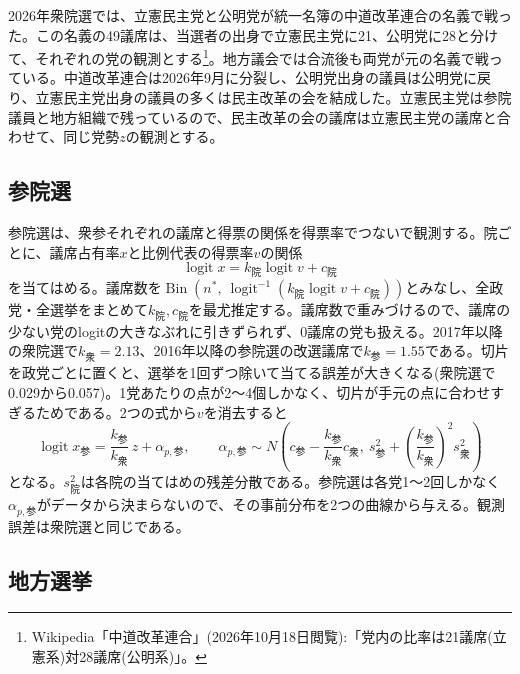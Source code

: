 \documentclass[a4paper,11pt]{ltjsarticle}
\begin{document}
2026年衆院選では、立憲民主党と公明党が統一名簿の中道改革連合の名義で戦った。この名義の49議席は、当選者の出身で立憲民主党に21、公明党に28と分けて、それぞれの党の観測とする\footnote{Wikipedia「中道改革連合」(2026年10月18日閲覧):「党内の比率は21議席(立憲系)対28議席(公明系)」。}。地方議会では合流後も両党が元の名義で戦っている。中道改革連合は2026年9月に分裂し、公明党出身の議員は公明党に戻り、立憲民主党出身の議員の多くは民主改革の会を結成した。立憲民主党は参院議員と地方組織で残っているので、民主改革の会の議席は立憲民主党の議席と合わせて、同じ党勢$z$の観測とする。

\subsection{参院選}

参院選は、衆参それぞれの議席と得票の関係を得票率でつないで観測する。院ごとに、議席占有率$x$と比例代表の得票率$v$の関係
\begin{equation}
  \operatorname{logit}x = k_{\text{院}}\operatorname{logit}v + c_{\text{院}}
\end{equation}
を当てはめる。議席数を$\operatorname{Bin}(n^\ast,\ \operatorname{logit}^{-1}(k_{\text{院}}\operatorname{logit}v + c_{\text{院}}))$とみなし、全政党・全選挙をまとめて$k_{\text{院}},c_{\text{院}}$を最尤推定する。議席数で重みづけるので、議席の少ない党のlogitの大きなぶれに引きずられず、0議席の党も扱える。2017年以降の衆院選で$k_{\text{衆}}=2.13$、2016年以降の参院選の改選議席で$k_{\text{参}}=1.55$である。切片を政党ごとに置くと、選挙を1回ずつ除いて当てる誤差が大きくなる(衆院選で0.029から0.057)。1党あたりの点が2〜4個しかなく、切片が手元の点に合わせすぎるためである。2つの式から$v$を消去すると
\begin{equation}
  \operatorname{logit}x_{\text{参}} = \frac{k_{\text{参}}}{k_{\text{衆}}}\,z + \alpha_{p,\text{参}},\qquad
  \alpha_{p,\text{参}} \sim N\!\left(c_{\text{参}}-\frac{k_{\text{参}}}{k_{\text{衆}}}c_{\text{衆}},\ s^2_{\text{参}}+\left(\frac{k_{\text{参}}}{k_{\text{衆}}}\right)^2 s^2_{\text{衆}}\right)
\end{equation}
となる。$s^2_{\text{院}}$は各院の当てはめの残差分散である。参院選は各党1〜2回しかなく$\alpha_{p,\text{参}}$がデータから決まらないので、その事前分布を2つの曲線から与える。観測誤差は衆院選と同じである。

\subsection{地方選挙}
\end{document}
